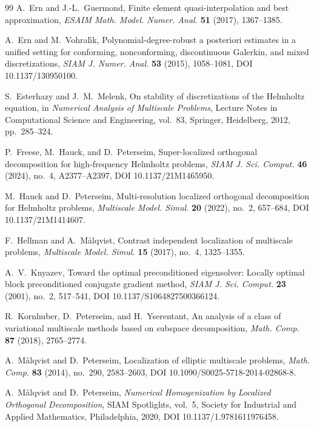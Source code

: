 \begin{thebibliography}{99}
A.~Ern and J.-L.~Guermond,
Finite element quasi-interpolation and best approximation,
\emph{ESAIM Math. Model. Numer. Anal.} \textbf{51} (2017),
1367--1385.

A.~Ern and M.~Vohral\'{\i}k,
Polynomial-degree-robust a posteriori estimates in a unified setting for
conforming, nonconforming, discontinuous Galerkin, and mixed
discretizations,
\emph{SIAM J. Numer. Anal.} \textbf{53} (2015), 1058--1081,
DOI 10.1137/130950100.

S.~Esterhazy and J.~M.~Melenk,
On stability of discretizations of the Helmholtz equation,
in \emph{Numerical Analysis of Multiscale Problems},
Lecture Notes in Computational Science and Engineering, vol.~83,
Springer, Heidelberg, 2012, pp.~285--324.

P.~Freese, M.~Hauck, and D.~Peterseim,
Super-localized orthogonal decomposition for high-frequency Helmholtz
problems,
\emph{SIAM J. Sci. Comput.} \textbf{46} (2024), no.~4,
A2377--A2397, DOI 10.1137/21M1465950.

M.~Hauck and D.~Peterseim,
Multi-resolution localized orthogonal decomposition for Helmholtz problems,
\emph{Multiscale Model. Simul.} \textbf{20} (2022), no.~2,
657--684, DOI 10.1137/21M1414607.

F.~Hellman and A.~M{\aa}lqvist,
Contrast independent localization of multiscale problems,
\emph{Multiscale Model. Simul.} \textbf{15} (2017), no.~4,
1325--1355.

A.~V.~Knyazev,
Toward the optimal preconditioned eigensolver: Locally optimal block
preconditioned conjugate gradient method,
\emph{SIAM J. Sci. Comput.} \textbf{23} (2001), no.~2, 517--541,
DOI 10.1137/S1064827500366124.

R.~Kornhuber, D.~Peterseim, and H.~Yserentant,
An analysis of a class of variational multiscale methods based on subspace
decomposition,
\emph{Math. Comp.} \textbf{87} (2018), 2765--2774.

A.~M{\aa}lqvist and D.~Peterseim,
Localization of elliptic multiscale problems,
\emph{Math. Comp.} \textbf{83} (2014), no.~290, 2583--2603,
DOI 10.1090/S0025-5718-2014-02868-8.

A.~M{\aa}lqvist and D.~Peterseim,
\emph{Numerical Homogenization by Localized Orthogonal Decomposition},
SIAM Spotlights, vol.~5, Society for Industrial and Applied Mathematics,
Philadelphia, 2020, DOI 10.1137/1.9781611976458.


\end{thebibliography}
